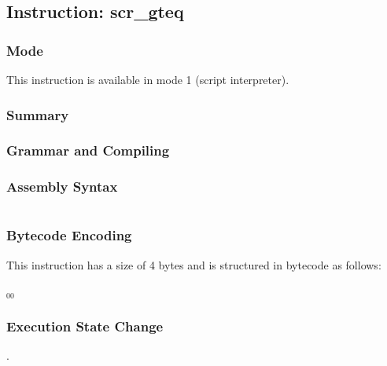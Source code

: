 \subsection{Instruction: scr\_gteq}

\subsubsection{Mode}
This instruction is available in mode 1 (script interpreter).
\subsubsection{Summary}


\subsubsection{Grammar and Compiling}


\subsubsection{Assembly Syntax}

\begin{myquote}
\begin{verbatim}

\end{verbatim}
\end{myquote}

\subsubsection{Bytecode Encoding}

This instruction has a size of 4 bytes and is structured in bytecode as follows:

$_{00}$\ 

\subsubsection{Execution State Change}

.


